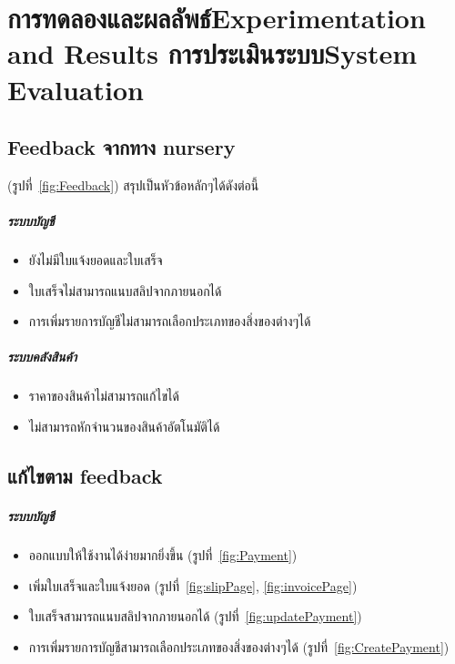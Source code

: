 \chapter{\ifproject%
\ifcpe การทดลองและผลลัพธ์\else Experimentation and Results\fi
\else%
\ifcpe การประเมินระบบ\else System Evaluation\fi
\fi}


\section{Feedback จากทาง nursery}
(รูปที่~\ref{fig:Feedback})
สรุปเป็นหัวข้อหลักๆได้ดังต่อนี้
\paragraph{ระบบบัญชี}
\begin{itemize}
    \item ยังไม่มีใบแจ้งยอดและใบเสร็จ
    \item ใบเสร็จไม่สามารถแนบสลิปจากภายนอกได้
    \item การเพิ่มรายการบัญชีไม่สามารถเลือกประเภทของสิ่งของต่างๆได้ 
\end{itemize}
\paragraph{ระบบคลังสินค้า}
\begin{itemize}
    \item ราคาของสินค้าไม่สามารถแก้ไขได้
    \item ไม่สามารถหักจำนวนของสินค้าอัตโนมัติได้
\end{itemize}

\section{แก้ไขตาม feedback}
\paragraph{ระบบบัญชี}
\begin{itemize}
    \item ออกแบบให้ใช้งานได้ง่ายมากยิ่งขึ้น (รูปที่~\ref{fig:Payment})
    \item เพิ่มใบเสร็จและใบแจ้งยอด (รูปที่~\ref{fig:slipPage}, \ref{fig:invoicePage})
    \item ใบเสร็จสามารถแนบสลิปจากภายนอกได้ (รูปที่~\ref{fig:updatePayment})
    \item การเพิ่มรายการบัญชีสามารถเลือกประเภทของสิ่งของต่างๆได้ (รูปที่~\ref{fig:CreatePayment})
\end{itemize}
